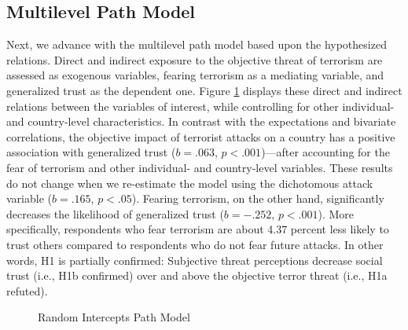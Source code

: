 \newpage
\subsection{Multilevel Path Model}
Next, we advance with the multilevel path model based upon the hypothesized relations. Direct and indirect exposure to the objective threat of terrorism are assessed as exogenous variables, fearing terrorism as a mediating variable, and generalized trust as the dependent one. Figure \ref{fig:art1-results1} displays these direct and indirect relations between the variables of interest, while controlling for other individual- and country-level characteristics. In contrast with the expectations and bivariate correlations, the objective impact of terrorist attacks on a country has a positive association with generalized trust ($b = .063$, $p < .001$)---after accounting for the fear of terrorism and other individual- and country-level variables. These results do not change when we re-estimate the model using the dichotomous attack variable ($b = .165$, $p < .05$). Fearing terrorism, on the other hand, significantly decreases the likelihood of generalized trust ($b = -.252$, $p < .001$). More specifically, respondents who fear terrorism are about 4.37 percent less likely to trust others compared to respondents who do not fear future attacks. In other words, H1 is partially confirmed: Subjective threat perceptions decrease social trust (i.e., H1b confirmed) over and above the objective terror threat (i.e., H1a refuted). 

\begin{figure}[H]
\centering
{}
\caption{Random Intercepts Path Model}
\label{fig:art1-results1}    
\end{figure}

